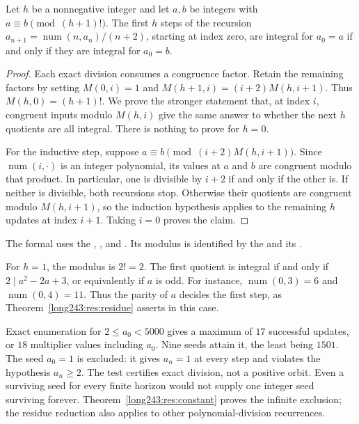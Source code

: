 \documentclass[11pt]{article}
\newcommand{\fnum}{\operatorname{num}}
\begin{document}
\begin{theorem}\label{long243:res:residue}
Let $h$ be a nonnegative integer and let $a,b$ be integers with $a\equiv b\pmod{(h+1)!}$.
The first $h$ steps of the recursion
$a_{n+1}=\fnum(n,a_n)/(n+2)$, starting at index zero, are integral
for $a_0=a$ if and only if they are integral for $a_0=b$.
\end{theorem}

\begin{proof}
Each exact division consumes a congruence factor. Retain the remaining
factors by setting $M(0,i)=1$ and $M(h+1,i)=(i+2)M(h,i+1)$. Thus
$M(h,0)=(h+1)!$. We prove the stronger statement that, at index $i$,
congruent inputs modulo $M(h,i)$ give the same answer to whether the
next $h$ quotients are all integral.
There is nothing to prove for $h=0$.

For the inductive step, suppose
$a\equiv b\pmod{(i+2)M(h,i+1)}$. Since $\fnum(i,\cdot)$ is an integer
polynomial, its values at $a$ and $b$ are congruent modulo that product.
In particular, one is divisible by $i+2$ if and only if the other is.
If neither is divisible, both recursions stop. Otherwise their quotients
are congruent modulo $M(h,i+1)$, so the induction hypothesis applies
to the remaining $h$ updates at index $i+1$. Taking $i=0$ proves the claim.
\end{proof}

\noindent The formal
 uses the
,
, and
. Its modulus is identified by the
 and its
.

For $h=1$, the modulus is $2!=2$. The first quotient is integral
if and only if $2\mid a^2-2a+3$, or equivalently if $a$ is odd.
For instance, $\fnum(0,3)=6$ and $\fnum(0,4)=11$. Thus the parity
of $a$ decides the first step, as Theorem~\ref{long243:res:residue}
asserts in this case.

Exact enumeration for $2\le a_0<5000$ gives a maximum of $17$
successful updates, or $18$ multiplier values including $a_0$.
Nine seeds attain it, the least being $1501$. The seed $a_0=1$ is excluded:
it gives $a_n=1$ at every step and violates the hypothesis $a_n\ge2$.
The test certifies exact division, not a positive orbit. Even a
surviving seed for every finite horizon would not supply one integer
seed surviving forever. Theorem~\ref{long243:res:constant} proves the
infinite exclusion; the residue reduction also applies to other
polynomial-division recurrences.
\end{document}

